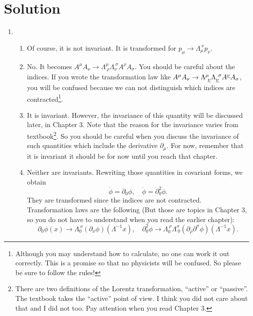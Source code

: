 \documentclass[a4paper,pdftex]{article}
\begin{document}
\begin{enumerate}
\end{enumerate}


\section{Solution}

\begin{enumerate}

   \item 
   \begin{enumerate}

      \item 
      Of course, it is not invariant. It is transformed for $p_{\mu}\rightarrow\Lambda_{\mu}^{\ \nu}p_{\nu}$. 

      \item 
      No. It becomes $A^{\mu}A_{\nu}\rightarrow\Lambda^{\mu}_{\ \rho}\Lambda_{\nu}^{\ \sigma}A^{\rho}A_{\sigma}$. You should be careful about the indices. If you wrote the transformation law like $A^{\mu}A_{\nu}\rightarrow\Lambda^{\mu}_{\ \uline{\nu}}\Lambda_{\uline{\nu}}^{\ \sigma}A^{\uline{\nu}}A_{\sigma}$, you will be confused because we can not distinguish which indices are contracted\footnote{
         Although you may understand how to calculate, no one can work it out correctly. This is a promise so that no physicists will be confused. So please be sure to follow the rules!
      }.

      \item 
      It is invariant. However, the invariance of this quantity will be discussed later, in Chapter 3. Note that the reason for the invariance varies from textbook\footnote{
         There are two definitions of the Lorentz transformation, ``active'' or ``passive''. The textbook takes the ``active'' point of view. I think you did not care about that and I did not too. Pay attention when you read Chapter 3.
      }. So you should be careful when you discuss the invariance of such quantities which include the derivative $\partial_{\mu}$. For now, remember that it is invariant it should be for now until you reach that chapter.

      \item 
      Neither are invariants. Rewriting those quantities in covariant forms, we obtain
      \begin{equation}
         \dot{\phi}
         =
         \partial_{0}\phi
         ,\quad
         \ddot{\phi}
         =
         \partial_{0}^2\phi         
         .
      \end{equation}
      They are transformed since the indices are not contracted. Transformation laws are the following (But those are topics in Chapter 3, so you do not have to understand when you read the earlier chapter):
      \begin{equation}
         \partial_{0}\phi(x)
         \rightarrow
         \Lambda_{0}^{\ \nu}(\partial_{\nu}\phi)(\Lambda^{-1}x)
         ,\quad
         \partial_{0}^2\phi     
         \rightarrow
         \Lambda_{0}^{\ \rho}\Lambda^{\sigma}_{\ 0}
         (\partial_{\rho}\partial^{\sigma}\phi)(\Lambda^{-1}x)
         .
      \end{equation}


\end{enumerate}
\end{enumerate}
\end{document}
